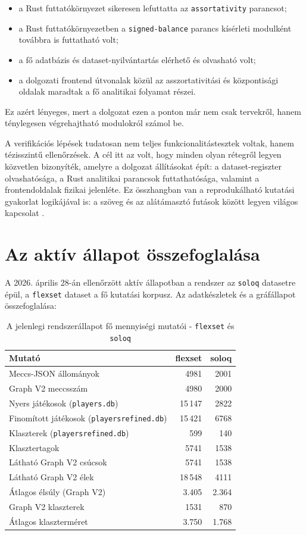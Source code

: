 ﻿\documentclass[a4paper,12pt]{report}
\begin{document}
\begin{itemize}
    \item a Rust futtatókörnyezet sikeresen lefuttatta az \texttt{assortativity} parancsot;
    \item a Rust futtatókörnyezetben a \texttt{signed-balance} parancs kísérleti modulként továbbra is futtatható volt;
    \item a fő adatbázis és dataset-nyilvántartás elérhető és olvasható volt;
    \item a dolgozati frontend útvonalak közül az asszortativitási és központisági oldalak maradtak a fő analitikai folyamat részei.
\end{itemize}

Ez azért lényeges, mert a dolgozat ezen a ponton már nem csak tervekről, hanem ténylegesen végrehajtható modulokról számol be.

A verifikációs lépések tudatosan nem teljes funkcionalitástesztek voltak, hanem tézisszintű ellenőrzések. A cél itt az volt, hogy minden olyan rétegről legyen közvetlen bizonyíték, amelyre a dolgozat állításokat épít: a dataset-regiszter olvashatósága, a Rust analitikai parancsok futtathatósága, valamint a frontendoldalak fizikai jelenléte. Ez összhangban van a reprodukálható kutatási gyakorlat logikájával is: a szöveg és az alátámasztó futások között legyen világos kapcsolat \cite{sandve2013}.

\section{Az aktív állapot összefoglalása}

A 2026. április 28-án ellenőrzött aktív állapotban a rendszer az \texttt{soloq} datasetre épül, a \texttt{flexset} dataset a fő kutatási korpusz. Az adatkészletek és a gráfállapot összefoglalása:

\begin{table}[H]
\centering
\caption{A jelenlegi rendszerállapot fő mennyiségi mutatói - \texttt{flexset} és \texttt{soloq}}
\begin{tabular}{lrr}
\toprule
\textbf{Mutató} & \textbf{flexset} & \textbf{soloq} \\
\midrule
Meccs-JSON állományok & 4981 & 2001 \\
Graph V2 meccsszám & 4980 & 2000 \\
Nyers játékosok (\texttt{players.db}) & 15\,147 & 2822 \\
Finomított játékosok (\texttt{playersrefined.db}) & 15\,421 & 6768 \\
Klaszterek (\texttt{playersrefined.db}) & 599 & 140 \\
Klasztertagok & 5741 & 1538 \\
Látható Graph V2 csúcsok & 5741 & 1538 \\
Látható Graph V2 élek & 18\,548 & 4111 \\
Átlagos élsúly (Graph V2) & 3.405 & 2.364 \\
Graph V2 klaszterek & 1531 & 870 \\
Átlagos klaszterméret & 3.750 & 1.768 \\
\bottomrule
\end{tabular}
\end{table}
\end{document}

